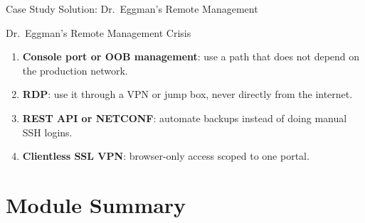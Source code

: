 \documentclass[aspectratio=169]{beamer}  %
\begin{document}
\begin{frame}[t]{Case Study Solution: Dr.\ Eggman's Remote Management}
    \begin{casesolution}{Dr.\ Eggman's Remote Management Crisis}
        \begin{enumerate}
            \footnotesize
            \item \textbf{Console port or OOB management}: use a path that does not depend on the production network.
            \item \textbf{RDP}: use it through a VPN or jump box, never directly from the internet.
            \item \textbf{REST API or NETCONF}: automate backups instead of doing manual SSH logins.
            \item \textbf{Clientless SSL VPN}: browser-only access scoped to one portal.
        \end{enumerate}
    \end{casesolution}
\end{frame}

\section*{Module Summary}
\end{document}
